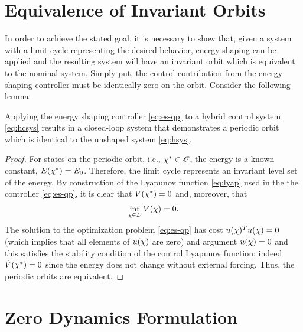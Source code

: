 \documentclass[twocolumn]{article}
\begin{document}
\section{Equivalence of Invariant Orbits}

In order to achieve the stated goal, it is necessary to show that, given a system with a limit cycle representing the desired behavior, energy shaping can be applied and the resulting system will have an invariant orbit which is equivalent to the nominal system. Simply put, the control contribution from the energy shaping controller must be identically zero on the orbit. Consider the following lemma:

\begin{lemma}
  Applying the energy shaping controller \eqref{eq:es-qp} to a hybrid control system \eqref{eq:hcsys} results in a closed-loop system that demonstrates a periodic orbit which is identical to the unshaped system \eqref{eq:hsys}.
\end{lemma}

\begin{proof}
  For states on the periodic orbit, i.e., $\chi^{*} \in \mathscr{O}$, the energy is a known constant, $E(\chi^{*}) = E_{0}$.
  Therefore, the limit cycle represents an invariant level set of the energy.
  By construction of the Lyapunov function \eqref{eq:lyap} used in the the controller \eqref{eq:es-qp}, it is clear that $V(\chi^{*}) = 0$ and, moreover, that
  \begin{align}
    \inf_{\chi \in D} V(\chi) = 0.
  \end{align}
  The solution to the optimization problem \eqref{eq:es-qp} has cost $u(\chi)^T u(\chi) = 0$ (which implies that all elements of $u(\chi)$ are zero) and argument $u(\chi) = 0$ and this satisfies the stability condition of the control Lyapunov function; indeed ${\dot V}(\chi^{*}) = 0$ since the energy does not change without external forcing.
  Thus, the periodic orbits are equivalent.
\end{proof}

\section{Zero Dynamics Formulation}
\end{document}
